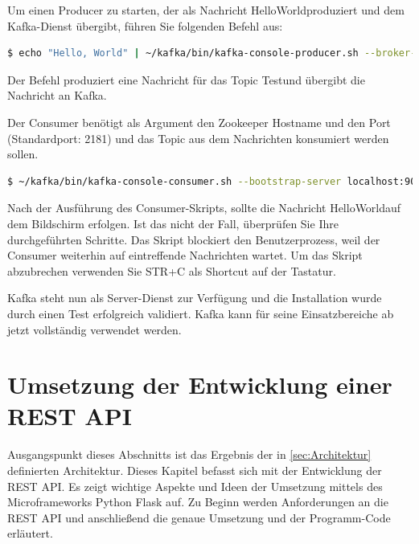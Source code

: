 \documentclass[a4paper,titlepage,halfparskip,12pt]{scrreprt}
\begin{document}
\begin{onehalfspacing}
Um einen Producer zu starten, der als Nachricht \glqq HelloWorld\grqq produziert und dem Kafka-Dienst übergibt, führen Sie folgenden Befehl aus:

\smallskip

\begin{lstlisting}[language=Bash]
$ echo "Hello, World" | ~/kafka/bin/kafka-console-producer.sh --broker-list localhost:9092 --topic Test > /dev/null
\end{lstlisting}

Der Befehl produziert eine Nachricht für das Topic \glqq Test\grqq und übergibt die Nachricht an Kafka.

Der Consumer benötigt als Argument den Zookeeper Hostname und den Port (Standardport: 2181) und das Topic aus dem Nachrichten konsumiert werden sollen.

\smallskip

\begin{lstlisting}[language=Bash]
$ ~/kafka/bin/kafka-console-consumer.sh --bootstrap-server localhost:9092 --topic Test --from-beginning
\end{lstlisting}

Nach der Ausführung des Consumer-Skripts, sollte die Nachricht \glqq HelloWorld\grqq auf dem Bildschirm erfolgen. Ist das nicht der Fall, überprüfen Sie Ihre durchgeführten Schritte. Das Skript blockiert den Benutzerprozess, weil der Consumer weiterhin auf eintreffende Nachrichten wartet. Um das Skript abzubrechen verwenden Sie STR+C als Shortcut auf der Tastatur.

Kafka steht nun als Server-Dienst zur Verfügung und die Installation wurde durch einen Test erfolgreich validiert. Kafka kann für seine Einsatzbereiche ab jetzt vollständig verwendet werden.

\pagebreak

\section{Umsetzung der Entwicklung einer \acs{REST} \acs{API}}
\label{subsec:Backend}

Ausgangspunkt dieses Abschnitts ist das Ergebnis der in \autoref{sec:Architektur} definierten Architektur. Dieses Kapitel befasst sich mit der Entwicklung der \acs{REST} \acs{API}. Es zeigt wichtige Aspekte und Ideen der Umsetzung mittels des Microframeworks Python Flask auf. Zu Beginn werden Anforderungen an die \acs{REST} \acs{API} und anschließend die genaue Umsetzung und der Programm-Code erläutert.


\end{onehalfspacing}
\end{document}
